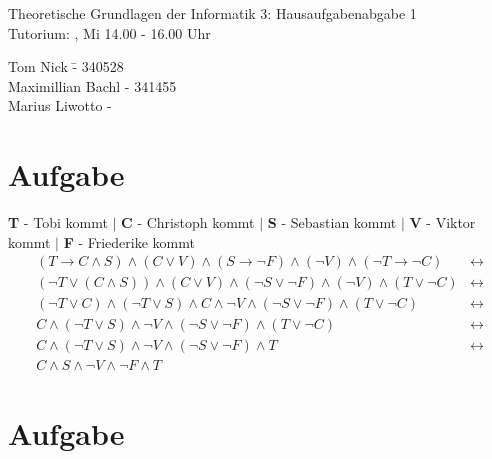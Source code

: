 \documentclass[a4paper,10pt]{scrartcl}
\author{}
\begin{document}
\begin{center}
\Large{Theoretische Grundlagen der Informatik 3: Hausaufgabenabgabe 1} \\
\large{Tutorium: , Mi 14.00 - 16.00 Uhr}
\end{center}
\begin{tabbing}
Tom Nick \hspace{2cm}\= - 340528\\
Maximillian Bachl \> - 341455 \\
Marius Liwotto\> -  
\end{tabbing}

\section{Aufgabe}
\textbf{T} - Tobi kommt $\mid$
\textbf{C} - Christoph kommt $\mid$
\textbf{S} - Sebastian kommt $\mid$
\textbf{V} - Viktor kommt $\mid$
\textbf{F} - Friederike kommt
\begin{align*}
(T \to C \land S) \land
(C \lor V) \land
(S \to \lnot F) \land
(\lnot V) \land
(\lnot T \to \lnot C) &\leftrightarrow \\
(\lnot T \lor (C \land S)) \land
(C \lor V) \land
(\lnot S \lor \lnot F) \land
(\lnot V) \land
(T \lor \lnot C) &\leftrightarrow \\
(\lnot T \lor C) \land (\lnot T \lor S) \land
C \land \lnot V \land
(\lnot S \lor \lnot F) \land
(T \lor \lnot C) &\leftrightarrow \\
C \land (\lnot T \lor S) \land
\lnot V \land
(\lnot S \lor \lnot F) \land
(T \lor \lnot C) &\leftrightarrow \\
C \land (\lnot T \lor S) \land
\lnot V \land
(\lnot S \lor \lnot F) \land
T &\leftrightarrow \\
C \land S \land
\lnot V \land
\lnot F \land
T
\end{align*}

\section{Aufgabe}
\end{document}
